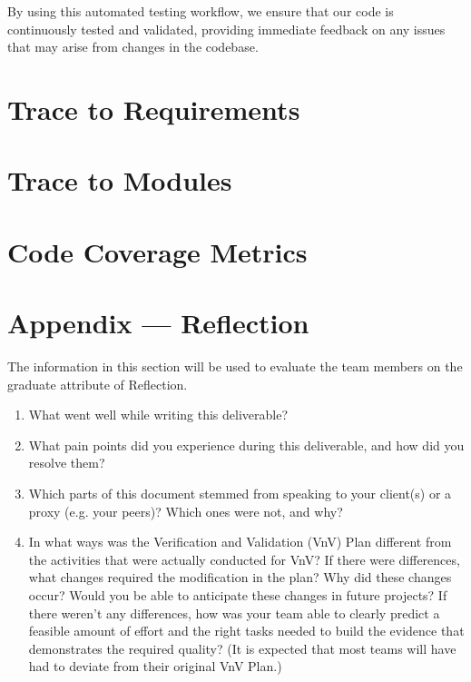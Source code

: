 \documentclass[12pt, titlepage]{article}
\begin{document}
By using this automated testing workflow, we ensure that our code is continuously tested and validated, providing immediate feedback on any issues that may arise from changes in the codebase.
		
\section{Trace to Requirements}
		
\section{Trace to Modules}		

\section{Code Coverage Metrics}




\newpage{}
\section*{Appendix --- Reflection}

The information in this section will be used to evaluate the team members on the
graduate attribute of Reflection.



\begin{enumerate}
  \item What went well while writing this deliverable? 
  \item What pain points did you experience during this deliverable, and how
    did you resolve them?
  \item Which parts of this document stemmed from speaking to your client(s) or
  a proxy (e.g. your peers)? Which ones were not, and why?
  \item In what ways was the Verification and Validation (VnV) Plan different
  from the activities that were actually conducted for VnV?  If there were
  differences, what changes required the modification in the plan?  Why did
  these changes occur?  Would you be able to anticipate these changes in future
  projects?  If there weren't any differences, how was your team able to clearly
  predict a feasible amount of effort and the right tasks needed to build the
  evidence that demonstrates the required quality?  (It is expected that most
  teams will have had to deviate from their original VnV Plan.)
\end{enumerate}
\end{document}
